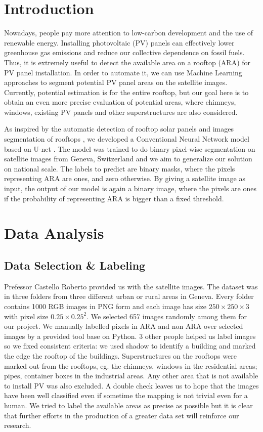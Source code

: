 \documentclass[9pt,conference,compsocconf]{IEEEtran}
\begin{document}
\section{Introduction}
Nowadays, people pay more attention to low-carbon development and the use of renewable energy. Installing photovoltaic (PV) panels can effectively lower greenhouse gas emissions and reduce our collective dependence on fossil fuels. Thus, it is extremely useful to detect the available area on a rooftop (ARA) for PV panel installation. In order to automate it, we can use Machine Learning approaches to segment potential PV panel areas on the satellite images. Currently, potential estimation is for the entire rooftop, but our goal here is to obtain an even more precise evaluation of potential areas, where chimneys, windows, existing PV panels and other superstructures are also considered.

As inspired by the automatic detection of rooftop solar panels \cite{castello2019deep} and images segmentation of rooftops \cite{chhor2017satellite}, we developed a Conventional Neural Network model based on U-net \cite{ronneberger2015u}. The model was trained to do binary pixel-wise segmentation on satellite images from Geneva, Switzerland and we aim to generalize our solution on national scale. The labels to predict are binary masks, where the pixels representing ARA are ones, and zero otherwise. By giving a satellite image as input, the output of our model is again a binary image, where the pixels are ones if the probability of representing ARA is bigger than a fixed threshold.


\section{Data Analysis}
\label{sec:dataAnalysis}

\subsection{Data Selection \& Labeling }
\label{subsec:dataSelectionLabeling }
Prefessor Castello Roberto provided us with the satellite images. The dataset was in three folders from three different urban or rural areas in Geneva. Every folder contains 1000 RGB images in PNG form and each image has size $250\times250\times3$ with pixel size $0.25\times 0.25^2$. We selected 657 images randomly among them for our project.
We manually labelled pixels in ARA and non ARA over selected images by a provided tool base on Python. 3 other people helped us label images so we fixed consistent criteria: we used shadow to identify a building and marked the edge the rooftop of the buildings. Superstructures on the rooftops were marked out from the rooftops, eg. the chimneys, windows in the residential areas; pipes, container boxes in the industrial areas. Any other area that is not available to install PV was also excluded. A double check leaves us to hope that the images have been well classified even if sometime the mapping is not trivial even for a human. We tried to label the available areas as precise as possible but it is clear that further efforts in the production of a greater data set will reinforce our research.
\end{document}
